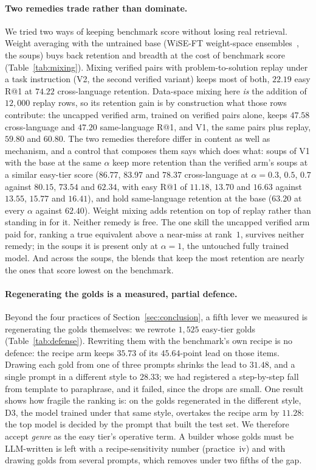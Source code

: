 \paragraph{Two remedies trade rather than dominate.}We tried two ways of keeping benchmark score without losing real retrieval. Weight averaging with the untrained base (WiSE-FT weight-space ensembles~\citep{wortsman2022wiseft}, the soups) buys back retention and breadth at the cost of benchmark score (Table~\ref{tab:mixing}). Mixing verified pairs with problem-to-solution replay under a task instruction (V2, the second verified variant) keeps most of both, $22.19$ easy R@1 at $74.22$ cross-language retention. Data-space mixing here \emph{is} the addition of $12{,}000$ replay rows, so its retention gain is by construction what those rows contribute: the uncapped verified arm, trained on verified pairs alone, keeps $47.58$ cross-language and $47.20$ same-language R@1, and V1, the same pairs plus replay, $59.80$ and $60.80$. The two remedies therefore differ in content as well as mechanism, and a control that composes them says which does what: soups of V1 with the base at the same $\alpha$ keep more retention than the verified arm's soups at a similar easy-tier score ($86.77$, $83.97$ and $78.37$ cross-language at $\alpha = 0.3$, $0.5$, $0.7$ against $80.15$, $73.54$ and $62.34$, with easy R@1 of $11.18$, $13.70$ and $16.63$ against $13.55$, $15.77$ and $16.41$), and hold same-language retention at the base ($63.20$ at every $\alpha$ against $62.40$). Weight mixing adds retention on top of replay rather than standing in for it. Neither remedy is free. The one skill the uncapped verified arm paid for, ranking a true equivalent above a near-miss at rank~$1$, survives neither remedy; in the soups it is present only at $\alpha=1$, the untouched fully trained model. And across the soups, the blends that keep the most retention are nearly the ones that score lowest on the benchmark.

\paragraph{Regenerating the golds is a measured, partial defence.}Beyond the four practices of Section~\ref{sec:conclusion}, a fifth lever we measured is regenerating the golds themselves: we rewrote $1{,}525$ easy-tier golds (Table~\ref{tab:defense}). Rewriting them with the benchmark's own recipe is no defence: the recipe arm keeps $35.73$ of its $45.64$-point lead on those items. Drawing each gold from one of three prompts shrinks the lead to $31.48$, and a single prompt in a different style to $28.33$; we had registered a step-by-step fall from template to paraphrase, and it failed, since the drops are small. One result shows how fragile the ranking is: on the golds regenerated in the different style, D3, the model trained under that same style, overtakes the recipe arm by $11.28$: the top model is decided by the prompt that built the test set. We therefore accept \emph{genre} as the easy tier's operative term. A builder whose golds must be LLM-written is left with a recipe-sensitivity number (practice~iv) and with drawing golds from several prompts, which removes under two fifths of the gap.

